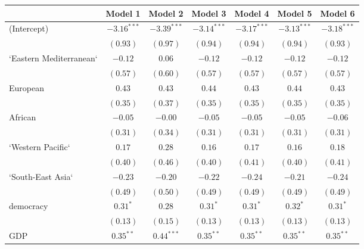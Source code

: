 
\begin{table}[!h]
\begin{center}
\begin{tabular}{l c c c c c c }
\toprule
 & Model 1 & Model 2 & Model 3 & Model 4 & Model 5 & Model 6 \\
\midrule
(Intercept)             & $-3.16^{***}$ & $-3.39^{***}$ & $-3.14^{***}$ & $-3.17^{***}$ & $-3.13^{***}$ & $-3.18^{***}$ \\
                        & $(0.93)$      & $(0.97)$      & $(0.94)$      & $(0.94)$      & $(0.94)$      & $(0.93)$      \\
`Eastern Mediterranean` & $-0.12$       & $0.06$        & $-0.12$       & $-0.12$       & $-0.12$       & $-0.12$       \\
                        & $(0.57)$      & $(0.60)$      & $(0.57)$      & $(0.57)$      & $(0.57)$      & $(0.57)$      \\
European                & $0.43$        & $0.43$        & $0.44$        & $0.43$        & $0.44$        & $0.43$        \\
                        & $(0.35)$      & $(0.37)$      & $(0.35)$      & $(0.35)$      & $(0.35)$      & $(0.35)$      \\
African                 & $-0.05$       & $-0.00$       & $-0.05$       & $-0.05$       & $-0.05$       & $-0.06$       \\
                        & $(0.31)$      & $(0.34)$      & $(0.31)$      & $(0.31)$      & $(0.31)$      & $(0.31)$      \\
`Western Pacific`       & $0.17$        & $0.28$        & $0.16$        & $0.17$        & $0.16$        & $0.18$        \\
                        & $(0.40)$      & $(0.46)$      & $(0.40)$      & $(0.41)$      & $(0.40)$      & $(0.41)$      \\
`South-East Asia`       & $-0.23$       & $-0.20$       & $-0.22$       & $-0.24$       & $-0.21$       & $-0.24$       \\
                        & $(0.49)$      & $(0.50)$      & $(0.49)$      & $(0.49)$      & $(0.49)$      & $(0.49)$      \\
democracy               & $0.31^{*}$    & $0.28$        & $0.31^{*}$    & $0.31^{*}$    & $0.32^{*}$    & $0.31^{*}$    \\
                        & $(0.13)$      & $(0.15)$      & $(0.13)$      & $(0.13)$      & $(0.13)$      & $(0.13)$      \\
GDP                     & $0.35^{**}$   & $0.44^{***}$  & $0.35^{**}$   & $0.35^{**}$   & $0.35^{**}$   & $0.35^{**}$   \\

\end{tabular}
\end{center}
\end{table}
